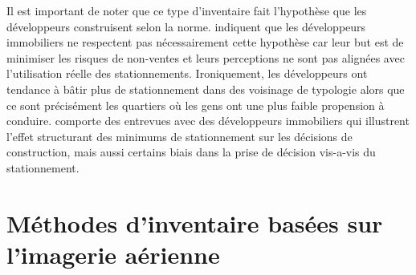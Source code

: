 Il est important de noter que ce type d'inventaire fait l'hypothèse que les développeurs construisent selon la norme. \textcite{Stangl:ParkingLots:2019} indiquent que les développeurs immobiliers ne respectent pas nécessairement cette hypothèse car leur but est de minimiser les risques de non-ventes et leurs perceptions ne sont pas alignées avec l'utilisation réelle des stationnements. Ironiquement, les développeurs ont tendance à bâtir plus de stationnement dans des voisinage de typologie  \fg{} \parencite{Voulgaris:SynergisticNeighborhood:2017} alors que ce sont précisément les quartiers où les gens ont une plus faible propension à conduire. \textcite{Stangl:ParkingLots:2019} comporte des entrevues avec des développeurs immobiliers qui illustrent l'effet structurant des minimums de stationnement sur les décisions de construction, mais aussi certains biais dans la prise de décision vis-a-vis du stationnement.

\section{Méthodes d'inventaire basées sur l'imagerie aérienne}

